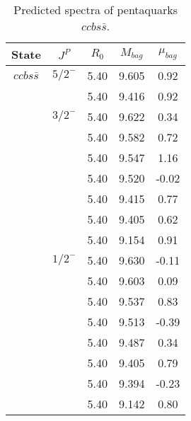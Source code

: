 \documentclass[prd,twocolumn,floatfix,nofootinbib]{revtex4}
\begin{document}
\renewcommand{\tabcolsep}{0.5cm}
\renewcommand{\arraystretch}{1.2}
\begin{table*}[!htbp]
    \caption{Predicted spectra of pentaquarks $ccbs\bar{s}$.}
    \begin{tabular}{ccccc}
        \hline\hline
        {\rm State} &$J^{P}$ &$R_{0}$ &$M_{bag}$ &$\mu_{bag}$ \\ \hline
        ${ccbs\bar{s}}$
            &${5/2}^{-}$    &5.40   &9.605  &0.92 \\
            &               &5.40   &9.416  &0.92 \\
            &${3/2}^{-}$    &5.40   &9.622  &0.34 \\
            &               &5.40   &9.582  &0.72 \\
            &               &5.40   &9.547  &1.16 \\
            &               &5.40   &9.520  &-0.02 \\
            &               &5.40   &9.415  &0.77 \\
            &               &5.40   &9.405  &0.62 \\
            &               &5.40   &9.154  &0.91 \\
            &${1/2}^{-}$    &5.40   &9.630  &-0.11 \\
            &               &5.40   &9.603  &0.09 \\
            &               &5.40   &9.537  &0.83 \\
            &               &5.40   &9.513  &-0.39 \\
            &               &5.40   &9.487  &0.34 \\
            &               &5.40   &9.405  &0.79 \\
            &               &5.40   &9.394  &-0.23 \\
            &               &5.40   &9.142  &0.80 \\
        \hline\hline
    \end{tabular}
\end{table*}
\end{document}
